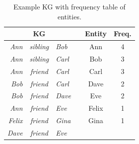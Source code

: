 \begin{table}[htbp]
\centering
\begin{tabular}{rcl|lcc}
\multicolumn{3}{c|}{\textbf{KG}}                    &  & \multicolumn{1}{l}{\textbf{Entity}} & \multicolumn{1}{l}{\textbf{Freq.}} \\\hline
\textit{Ann} & \textit{sibling} & \textit{Bob}   &  & Ann                               & 4                                      \\
\textit{Ann} & \textit{sibling} & \textit{Carl} &  & Bob                                 & 3                                      \\
\textit{Ann} & \textit{friend}  & \textit{Carl} &  & Carl                               & 3                                      \\
\textit{Bob}   & \textit{friend}  & \textit{Carl} &  & Dave                                & 2                                      \\
\textit{Bob}   & \textit{friend}  & \textit{Dave}  &  & Eve                                 & 2                                      \\
\textit{Ann} & \textit{friend}  & \textit{Eve}   &  & Felix                               & 1                                      \\
\textit{Felix} & \textit{friend}  & \textit{Gina}  &  & Gina                                & 1                                      \\
\textit{Dave}  & \textit{friend}  & \textit{Eve}   &  & \multicolumn{1}{l}{}                & \multicolumn{1}{l}{}                  
\end{tabular}
\caption[Example KG with frequency table of entities.]{Example KG with frequency table of entities.}
\label{entity_selection_KG}
\end{table}

